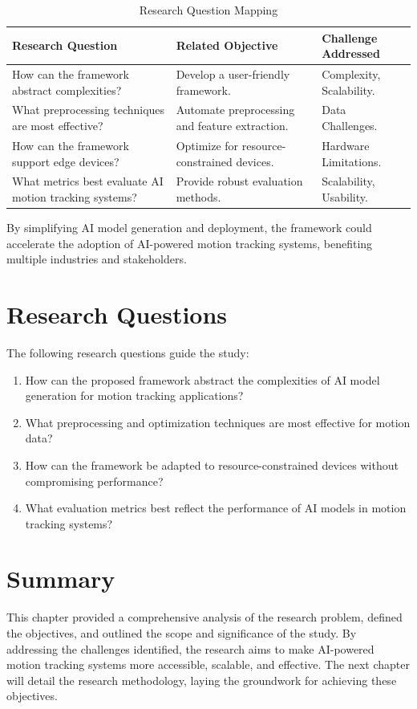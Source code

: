 \pagebreak

\begin{table}
    \centering
    \caption{Research Question Mapping }
    \label{tab:tab_5}
    \begin{tabular}{| p{5cm} | p{4cm} | p{4cm} |}
        \toprule
        \textbf{Research Question} & \textbf{Related Objective} & \textbf{Challenge Addressed}\\
        \hline
        How can the framework abstract complexities?&  Develop a user-friendly framework.& Complexity, Scalability.\\
        \hline
        What preprocessing techniques are most effective?&  Automate preprocessing and feature extraction.& Data Challenges.\\
        \hline
        How can the framework support edge devices?&  Optimize for resource-constrained devices.& Hardware Limitations.\\
        \hline
        What metrics best evaluate AI motion tracking systems?&  Provide robust evaluation methods.& Scalability, Usability.\\
        \bottomrule
    \end{tabular}
\end{table}

By simplifying AI model generation and deployment, the framework could accelerate the adoption of AI-powered motion tracking systems, benefiting multiple industries and stakeholders.

\section{Research Questions}
The following research questions guide the study:

\begin{enumerate}
    \item How can the proposed framework abstract the complexities of AI model generation for motion tracking applications?
    \item What preprocessing and optimization techniques are most effective for motion data?
    \item How can the framework be adapted to resource-constrained devices without compromising performance?
    \item What evaluation metrics best reflect the performance of AI models in motion tracking systems?
\end{enumerate}

\section{Summary}
This chapter provided a comprehensive analysis of the research problem, defined the objectives, and outlined the scope and significance of the study. By addressing the challenges identified, the research aims to make AI-powered motion tracking systems more accessible, scalable, and effective. The next chapter will detail the research methodology, laying the groundwork for achieving these objectives.
